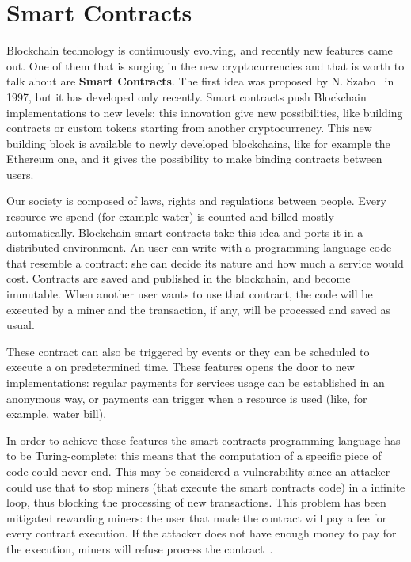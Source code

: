\section{Smart Contracts}
\label{sec:smart_contracts}

Blockchain technology is continuously evolving, and recently new features came
out. One of them that is surging in the new cryptocurrencies and that is worth
to talk about are \textbf{Smart Contracts}.
The first idea was proposed by N. Szabo~\cite{szabo97} in 1997, but it has
developed only recently. Smart contracts push Blockchain implementations to
new levels: this innovation give new possibilities, like building contracts or
custom tokens starting from another cryptocurrency.
This new building block is available to newly developed blockchains, like for
example the Ethereum one, and it gives the possibility to make binding
contracts between users.

Our society is composed of laws, rights and regulations between people. Every
resource we spend (for example water) is counted and billed mostly
automatically.
Blockchain smart contracts take this idea and ports it in a distributed
environment.
An user can write with a programming language code that resemble a contract: she
can decide its nature and how much a service would cost. Contracts are saved and
published in the blockchain, and become immutable.
When another user wants to use that contract, the code will be executed by a
miner and the transaction, if any, will be processed and saved as usual.

These contract can also be triggered by events or they can be scheduled to
execute a on predetermined time. These features opens the door to new
implementations: regular payments for services usage can be established in an
anonymous way, or payments can trigger when a resource is used (like, for
example, water bill).

In order to achieve these features the smart contracts programming language has
to be Turing-complete: this means that the computation of a specific piece of
code could never end. This may be considered a vulnerability since an attacker
could use that to stop miners (that execute the smart contracts code) in a
infinite loop, thus blocking the processing of new transactions.  This problem
has been mitigated rewarding miners: the user that made the contract will
pay a fee for every contract execution. If the attacker does not have enough
money to pay for the execution, miners will refuse process
the contract~\cite{kosba16}.
